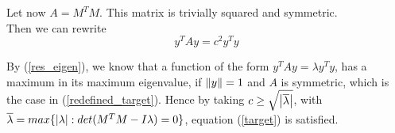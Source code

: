 \begin{homeworkProblem}
Let now $A = M^T M$. This matrix is trivially squared and symmetric. \\

Then we can rewrite
\begin{equation} \label{redefined_target}
    y^T A y = c^2 y^T y
\end{equation}

By (\ref{res_eigen}), we know that a function of the form $y^T A y = \lambda y^T y$, has a maximum in its maximum eigenvalue, if $\left\lVert y\right\rVert=1$ and $A$ is symmetric, which is the case in (\ref{redefined_target}). Hence by taking $c \geq \sqrt{\left\lvert\overline{\lambda}\right\rvert}$, with $\overline{\lambda} = max\{\left\lvert\lambda\right\rvert: det(M^T M - I \lambda) = 0\}$, equation (\ref{target}) is satisfied.

\end{homeworkProblem}


